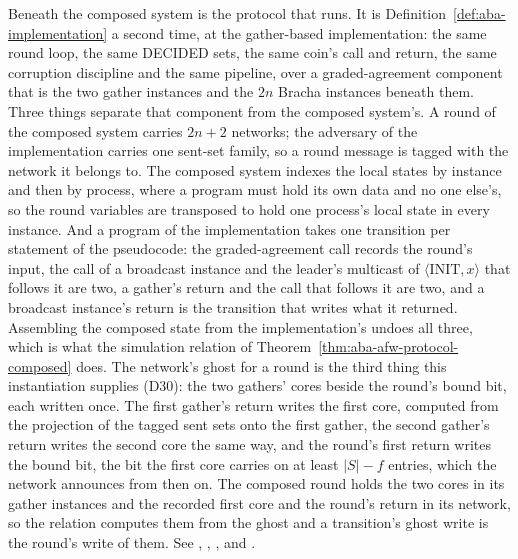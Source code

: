 Beneath the composed system is the protocol that runs.
It is Definition~\ref{def:aba-implementation} a second time, at the gather-based implementation: the same round loop, the same DECIDED sets, the same coin's call and return, the same corruption discipline and the same pipeline, over a graded-agreement component that is the two gather instances and the $2n$ Bracha instances beneath them.
Three things separate that component from the composed system's.
A round of the composed system carries $2n+2$ networks; the adversary of the implementation carries one sent-set family, so a round message is tagged with the network it belongs to.
The composed system indexes the local states by instance and then by process, where a program must hold its own data and no one else's, so the round variables are transposed to hold one process's local state in every instance.
And a program of the implementation takes one transition per statement of the pseudocode: the graded-agreement call records the round's input, the call of a broadcast instance and the leader's multicast of $\langle\mathrm{INIT}, x\rangle$ that follows it are two, a gather's return and the call that follows it are two, and a broadcast instance's return is the transition that writes what it returned.
Assembling the composed state from the implementation's undoes all three, which is what the simulation relation of Theorem~\ref{thm:aba-afw-protocol-composed} does.
The network's ghost for a round is the third thing this instantiation supplies (D30): the two gathers' cores beside the round's bound bit, each written once.
The first gather's return writes the first core, computed from the projection of the tagged sent sets onto the first gather, the second gather's return writes the second core the same way, and the round's first return writes the bound bit, the bit the first core carries on at least $|S| - f$ entries, which the network announces from then on.
The composed round holds the two cores in its gather instances and the recorded first core and the round's return in its network, so the relation computes them from the ghost and a transition's ghost write is the round's write of them.
See , , ,  and .

